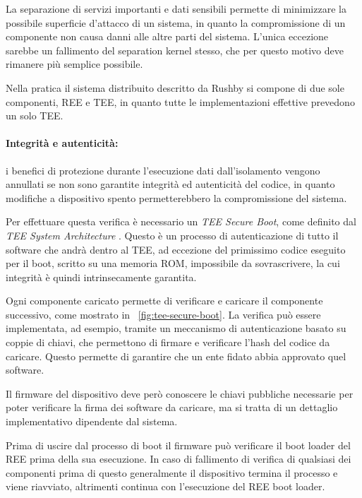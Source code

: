 \documentclass[12pt,italian]{report}
\begin{document}
	La separazione di servizi importanti e dati sensibili permette di minimizzare la possibile superficie d'attacco di un sistema, in quanto la compromissione di un componente non causa danni alle altre parti del sistema. L'unica eccezione sarebbe un fallimento del separation kernel stesso, che per questo motivo deve rimanere più semplice possibile. 
	
	Nella pratica il sistema distribuito descritto da Rushby si compone di due sole componenti, REE e TEE, in quanto tutte le implementazioni effettive prevedono un solo TEE.
	
	\newpage
	
	\paragraph{Integrità e autenticità:} i benefici di protezione durante l'esecuzione dati dall'isolamento vengono annullati se non sono garantite integrità ed autenticità del codice, in quanto modifiche a dispositivo spento permetterebbero la compromissione del sistema.
	
	\bigbreak
	
	Per effettuare questa verifica è necessario un \textit{TEE Secure Boot}, come definito dal \textit{TEE System Architecture} \cite{gp2020systemarchitecture}. Questo è un processo di autenticazione di tutto il software che andrà dentro al TEE, ad eccezione del primissimo codice eseguito per il boot, scritto su una memoria ROM, impossibile da sovrascrivere, la cui integrità è quindi intrinsecamente garantita.
	
	\bigbreak
	
	Ogni componente caricato permette di verificare e caricare il componente successivo, come mostrato in \figurename~\ref{fig:tee-secure-boot}. La verifica può essere implementata, ad esempio, tramite un meccanismo di autenticazione basato su coppie di chiavi, che permettono di firmare e verificare l'hash del codice da caricare. Questo permette di garantire che un ente fidato abbia approvato quel software.
	
	Il firmware del dispositivo deve però conoscere le chiavi pubbliche necessarie per poter verificare la firma dei software da caricare, ma si tratta di un dettaglio implementativo dipendente dal sistema.
	
	\bigbreak
	
	Prima di uscire dal processo di boot il firmware può verificare il boot loader del REE prima della sua esecuzione. In caso di fallimento di verifica di qualsiasi dei componenti prima di questo generalmente il dispositivo termina il processo e viene riavviato, altrimenti continua con l'esecuzione del REE boot loader.
	
\end{document}
